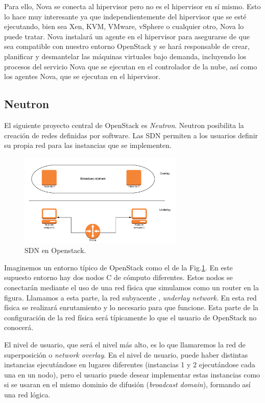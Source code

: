 Para ello, Nova se conecta al hipervisor pero no es el hipervisor en sí mismo. Esto lo hace muy interesante ya que independientemente del hipervisor que se esté ejecutando, bien sea Xen, KVM, VMware, vSphere o cualquier otro, Nova lo puede tratar. 
Nova instalará un agente en el hipervisor para asegurarse de que sea compatible con nuestro entorno OpenStack y se hará responsable de crear, planificar y  desmantelar las máquinas virtuales bajo demanda, incluyendo los procesos del servicio Nova que se ejecutan en el controlador de la nube, así como los agentes Nova, que se ejecutan en el hipervisor.

\subsection{Neutron}\label{subsec:Neutron}
El siguiente proyecto central de OpenStack es \textit{Neutron}. Neutron posibilita la creación de redes definidas por software. Las SDN permiten a los usuarios definir su propia red para las instancias que se implementen.\cite{noauthor_neutron_nodate}

\begin{figure}
    \centering
    \includegraphics[width=0.7\textwidth]{imagenes/capitulo2/sdn_openstack.png}
    \caption{SDN en Openstack.}
	\vspace{0.3cm}
    \label{SDN en Openstack}
\end{figure}

Imaginemos un entorno típico de OpenStack como el de la Fig.\ref{SDN en Openstack}. En este supuesto entorno hay dos nodos C de cómputo diferentes. Estos nodos se conectarán mediante el uso de una red física que simulamos como un router en la figura. Llamamos a esta parte, la red subyacente , \textit{underlay network}. En esta red física se realizará enrutamiento y lo necesario para que funcione. Esta parte de la configuración de la red física será típicamente lo que el usuario de OpenStack no conocerá.

El nivel de usuario, que será el nivel más alto, es lo que llamaremos la red de superposición o \textit{network overlay}. En el nivel de usuario, puede haber distintas instancias ejecutándose en lugares diferentes (instancias 1 y 2 ejecutándose cada una en un nodo), pero el usuario puede desear implementar estas instancias como si se usaran en el mismo dominio de difusión (\textit{broadcast domain}), formando así una red lógica.

